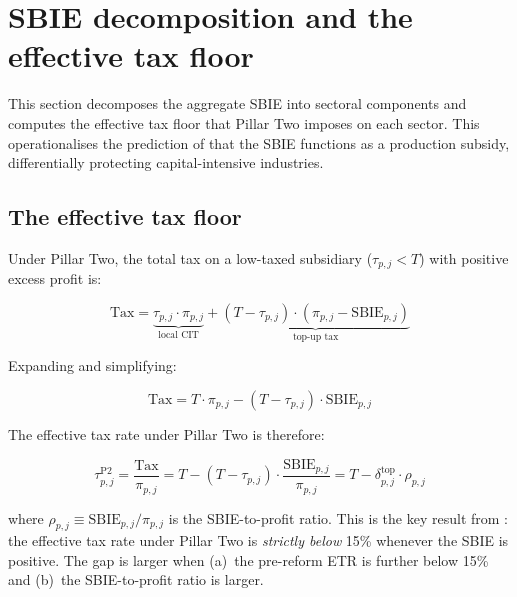 \documentclass[11pt,a4paper]{article}
\begin{document}
\section{SBIE decomposition and the effective tax floor}\label{sec:sbie}

This section decomposes the aggregate SBIE into sectoral components and computes the effective tax floor that Pillar Two imposes on each sector. This operationalises the prediction of \citet{schjelderup2024} that the SBIE functions as a production subsidy, differentially protecting capital-intensive industries.

\subsection{The effective tax floor}\label{sec:floor_theory}

Under Pillar Two, the total tax on a low-taxed subsidiary ($\tau_{p,j} < T$) with positive excess profit is:

\begin{equation}\label{eq:total_tax}
\text{Tax} = \underbrace{\tau_{p,j} \cdot \pi_{p,j}}_{\text{local CIT}} + \underbrace{(T - \tau_{p,j}) \cdot (\pi_{p,j} - \text{SBIE}_{p,j})}_{\text{top-up tax}}
\end{equation}

Expanding and simplifying:

\begin{equation}\label{eq:total_tax_simplified}
\text{Tax} = T \cdot \pi_{p,j} - (T - \tau_{p,j}) \cdot \text{SBIE}_{p,j}
\end{equation}

The effective tax rate under Pillar Two is therefore:

\begin{equation}\label{eq:etr_pillar2}
\tau_{p,j}^{\text{P2}} = \frac{\text{Tax}}{\pi_{p,j}} = T - (T - \tau_{p,j}) \cdot \frac{\text{SBIE}_{p,j}}{\pi_{p,j}} = T - \delta_{p,j}^{\text{top}} \cdot \rho_{p,j}
\end{equation}

where $\rho_{p,j} \equiv \text{SBIE}_{p,j} / \pi_{p,j}$ is the SBIE-to-profit ratio. This is the key result from \citet{schjelderup2024}: the effective tax rate under Pillar Two is \emph{strictly below} 15\% whenever the SBIE is positive. The gap is larger when (a)~the pre-reform ETR is further below 15\% and (b)~the SBIE-to-profit ratio is larger.
\end{document}
